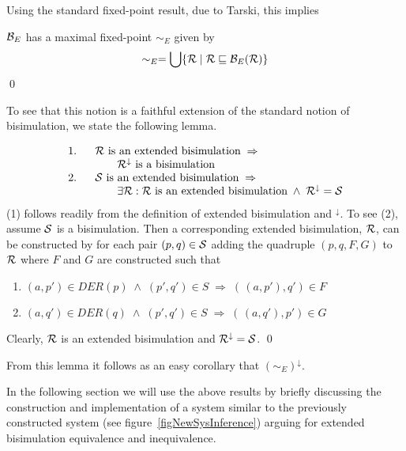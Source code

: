 Using the standard fixed-point result, due to Tarski, this implies
\begin{proposition}
${\cal B}_E$ has a maximal fixed-point $\sim_E$ given by
\[
\sim_E = \bigcup\{{\cal R}\mid {\cal R}\sqsubseteq{\cal B}_E({\cal R})\}
\]
\qed
\end{proposition}
To see that this notion is a faithful extension of the standard notion of bisimulation, we state the following lemma.
\begin{lemma}
\[
\begin{array}{llll}
\mbox{1.\ \ } & \multicolumn{3}{l}{{\cal R}\mbox{ is an extended bisimulation}\;\Rightarrow}\\
&&&{\cal R}^{\downarrow}\mbox{ is a bisimulation}\\
\mbox{2.\ \ } & \multicolumn{3}{l}{{\cal S}\mbox{ is an extended bisimulation}\;\Rightarrow}\\
&&&\exists{\cal R}: {\cal R} \mbox{ is an extended bisimulation}\;\wedge\; {\cal R}^{\downarrow} = {\cal S}\\
\end{array}
\]
\proof (1) follows readily from the definition of extended bisimulation and ${}^{\downarrow}$. To see (2), assume $\cal S$ is a bisimulation. Then a corresponding extended bisimulation, $\cal R$, can be constructed by for each pair $(p,q)\in{\cal S}$ adding the quadruple $(p,q,F,G)$ to $\cal R$ where $F$ and $G$ are constructed such that
\begin{enumerate}
\item $(a,p')\in DER(p)\;\wedge\;(p',q')\in S\;\Rightarrow\; (\,(a,p'),q')\in F$
\item $(a,q')\in DER(q)\;\wedge\;(p',q')\in S\;\Rightarrow\; (\,(a,q'),p')\in G$
\end{enumerate}
Clearly, $\cal R$ is an extended bisimulation and ${\cal R}^{\downarrow} = {\cal S}$.
\qed
\end{lemma}
From this lemma it follows as an easy corollary that $(\sim_E)^{\downarrow}$.

In the following section we will use the above results by briefly discussing the construction and implementation of a system similar to the previously constructed system (see figure~\ref{figNewSysInference}) arguing for extended bisimulation equivalence and inequivalence.


